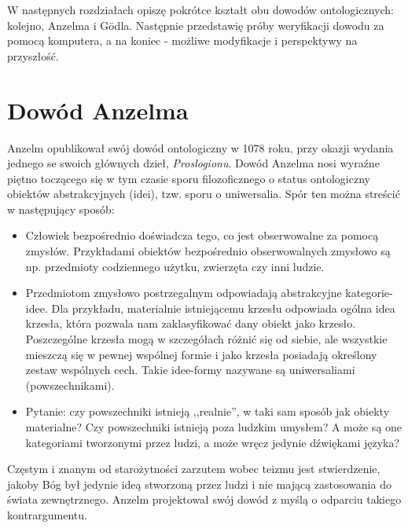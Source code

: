 \documentclass[runningheads]{llncs}
\begin{document}
W następnych rozdziałach opiszę pokrótce kształt obu dowodów ontologicznych: kolejno, Anzelma i G\"odla. Następnie przedstawię próby weryfikacji dowodu za pomocą komputera, a na koniec - możliwe modyfikacje i perspektywy na przyszłość. 

\section{Dowód Anzelma}
Anzelm opublikował swój dowód ontologiczny w 1078 roku, przy okazji wydania jednego se swoich głównych dzieł, \textit{Proslogionu}. Dowód Anzelma nosi wyraźne piętno toczącego się w tym czasie sporu filozoficznego o status ontologiczny obiektów abstrakcyjnych (idei), tzw. sporu o uniwersalia. Spór ten można streścić w następujący sposób:
\begin{itemize}
	\item Człowiek bezpośrednio doświadcza tego, co jest obserwowalne za pomocą zmysłów. Przykładami obiektów bezpośrednio obserwowalnych zmysłowo są np. przedmioty codziennego użytku, zwierzęta czy inni ludzie. 
	\item Przedmiotom zmysłowo postrzegalnym odpowiadają abstrakcyjne kategorie-idee. Dla przykładu, materialnie istniejącemu krzesłu odpowiada ogólna idea krzesła, która pozwala nam zaklasyfikować dany obiekt jako krzesło. Poszczególne krzesła mogą w szczegółach różnić się od siebie, ale wszystkie mieszczą się w pewnej wspólnej formie i jako krzesła posiadają określony zestaw wspólnych cech. Takie idee-formy nazywane są uniwersaliami (powszechnikami). 
	\item Pytanie: czy powszechniki istnieją ,,realnie'', w taki sam sposób jak obiekty materialne? Czy powszechniki istnieją poza ludzkim umysłem? A może są one kategoriami tworzonymi przez ludzi, a może wręcz jedynie dźwiękami języka?
\end{itemize}
Częstym i znanym od starożytności zarzutem wobec teizmu jest stwierdzenie, jakoby Bóg był jedynie ideą stworzoną przez ludzi i nie mającą zastosowania do świata zewnętrznego. Anzelm projektował swój dowód z myślą o odparciu takiego kontrargumentu. 
\end{document}
